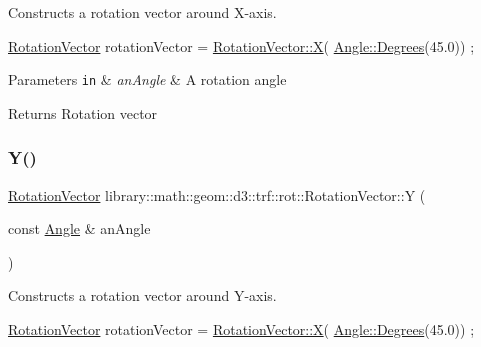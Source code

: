 Constructs a rotation vector around X-\/axis. 


\begin{DoxyCode}
\hyperlink{classlibrary_1_1math_1_1geom_1_1d3_1_1trf_1_1rot_1_1_rotation_vector_a49076a279f457fdb14c4a9d4d61e1738}{RotationVector} rotationVector = \hyperlink{classlibrary_1_1math_1_1geom_1_1d3_1_1trf_1_1rot_1_1_rotation_vector_a6b4cb091dd380a071faa158cbdd1b7ea}{RotationVector::X}(
      \hyperlink{classlibrary_1_1math_1_1geom_1_1_angle_a64aa53e8420aeb6f671d86c65c370bc8}{Angle::Degrees}(45.0)) ;
\end{DoxyCode}



\begin{DoxyParams}[1]{Parameters}
\mbox{\tt in}  & {\em an\+Angle} & A rotation angle \\
\hline
\end{DoxyParams}
\begin{DoxyReturn}{Returns}
Rotation vector 
\end{DoxyReturn}
\mbox{\label{classlibrary_1_1math_1_1geom_1_1d3_1_1trf_1_1rot_1_1_rotation_vector_a0fa2ba6e7806d5e72419f64f708518d4}} 
\subsubsection{\texorpdfstring{Y()}{Y()}}
{\footnotesize\ttfamily \hyperlink{classlibrary_1_1math_1_1geom_1_1d3_1_1trf_1_1rot_1_1_rotation_vector}{Rotation\+Vector} library\+::math\+::geom\+::d3\+::trf\+::rot\+::\+Rotation\+Vector\+::Y (\begin{DoxyParamCaption}\item[{const \hyperlink{classlibrary_1_1math_1_1geom_1_1_angle}{Angle} \&}]{an\+Angle }\end{DoxyParamCaption})\hspace{0.3cm}{\ttfamily [static]}}



Constructs a rotation vector around Y-\/axis. 


\begin{DoxyCode}
\hyperlink{classlibrary_1_1math_1_1geom_1_1d3_1_1trf_1_1rot_1_1_rotation_vector_a49076a279f457fdb14c4a9d4d61e1738}{RotationVector} rotationVector = \hyperlink{classlibrary_1_1math_1_1geom_1_1d3_1_1trf_1_1rot_1_1_rotation_vector_a6b4cb091dd380a071faa158cbdd1b7ea}{RotationVector::X}(
      \hyperlink{classlibrary_1_1math_1_1geom_1_1_angle_a64aa53e8420aeb6f671d86c65c370bc8}{Angle::Degrees}(45.0)) ;
\end{DoxyCode}




